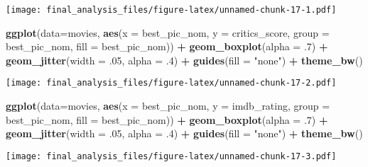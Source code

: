 \documentclass[]{article}
\newenvironment{Shaded}{\begin{snugshade}}{\end{snugshade}}
\newcommand{\DataTypeTok}[1]{\textcolor[rgb]{0.13,0.29,0.53}{#1}}
\newcommand{\FloatTok}[1]{\textcolor[rgb]{0.00,0.00,0.81}{#1}}
\newcommand{\KeywordTok}[1]{\textcolor[rgb]{0.13,0.29,0.53}{\textbf{#1}}}
\newcommand{\NormalTok}[1]{#1}
\newcommand{\OperatorTok}[1]{\textcolor[rgb]{0.81,0.36,0.00}{\textbf{#1}}}
\newcommand{\StringTok}[1]{\textcolor[rgb]{0.31,0.60,0.02}{#1}}
\begin{document}
\texttt{[image: final\_analysis\_files/figure-latex/unnamed-chunk-17-1.pdf]}

\begin{Shaded}
\begin{Highlighting}[]
\KeywordTok{ggplot}\NormalTok{(}\DataTypeTok{data=}\NormalTok{movies, }\KeywordTok{aes}\NormalTok{(}\DataTypeTok{x =}\NormalTok{ best_pic_nom, }\DataTypeTok{y =}\NormalTok{ critics_score, }\DataTypeTok{group =}\NormalTok{ best_pic_nom, }\DataTypeTok{fill =}\NormalTok{ best_pic_nom)) }\OperatorTok{+}\StringTok{ }\KeywordTok{geom_boxplot}\NormalTok{(}\DataTypeTok{alpha =} \FloatTok{.7}\NormalTok{) }\OperatorTok{+}\StringTok{ }\KeywordTok{geom_jitter}\NormalTok{(}\DataTypeTok{width =} \FloatTok{.05}\NormalTok{, }\DataTypeTok{alpha =} \FloatTok{.4}\NormalTok{) }\OperatorTok{+}\StringTok{ }\KeywordTok{guides}\NormalTok{(}\DataTypeTok{fill =} \StringTok{"none"}\NormalTok{) }\OperatorTok{+}\StringTok{ }\KeywordTok{theme_bw}\NormalTok{()}
\end{Highlighting}
\end{Shaded}

\texttt{[image: final\_analysis\_files/figure-latex/unnamed-chunk-17-2.pdf]}

\begin{Shaded}
\begin{Highlighting}[]
\KeywordTok{ggplot}\NormalTok{(}\DataTypeTok{data=}\NormalTok{movies, }\KeywordTok{aes}\NormalTok{(}\DataTypeTok{x =}\NormalTok{ best_pic_nom, }\DataTypeTok{y =}\NormalTok{ imdb_rating, }\DataTypeTok{group =}\NormalTok{ best_pic_nom, }\DataTypeTok{fill =}\NormalTok{ best_pic_nom)) }\OperatorTok{+}\StringTok{ }\KeywordTok{geom_boxplot}\NormalTok{(}\DataTypeTok{alpha =} \FloatTok{.7}\NormalTok{) }\OperatorTok{+}\StringTok{ }\KeywordTok{geom_jitter}\NormalTok{(}\DataTypeTok{width =} \FloatTok{.05}\NormalTok{, }\DataTypeTok{alpha =} \FloatTok{.4}\NormalTok{) }\OperatorTok{+}\StringTok{ }\KeywordTok{guides}\NormalTok{(}\DataTypeTok{fill =} \StringTok{"none"}\NormalTok{) }\OperatorTok{+}\StringTok{ }\KeywordTok{theme_bw}\NormalTok{()}
\end{Highlighting}
\end{Shaded}

\texttt{[image: final\_analysis\_files/figure-latex/unnamed-chunk-17-3.pdf]}

\begin{Shaded}
\end{Shaded}
\end{document}
